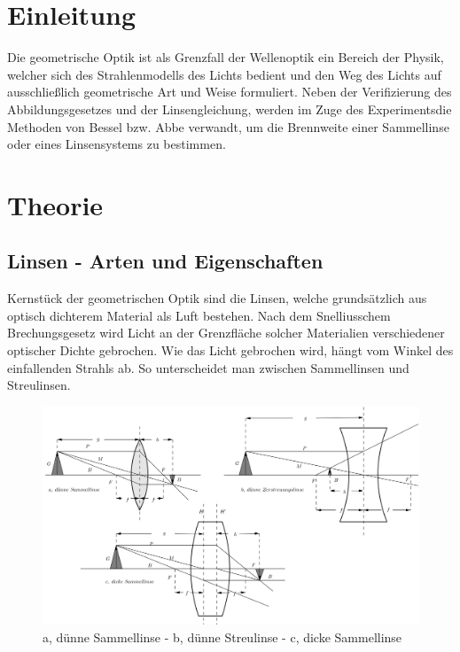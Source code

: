 
\section{Einleitung}
Die geometrische Optik ist als Grenzfall der Wellenoptik ein Bereich der Physik, welcher sich des Strahlenmodells des Lichts bedient und
den Weg des Lichts auf ausschließlich geometrische Art und Weise formuliert. Neben der Verifizierung des Abbildungsgesetzes und der 
Linsengleichung, werden im Zuge des Experimentsdie Methoden von Bessel bzw. Abbe verwandt, um die Brennweite einer Sammellinse oder 
eines Linsensystems zu bestimmen.

\section{Theorie}
\subsection{Linsen - Arten und Eigenschaften}
Kernstück der geometrischen Optik sind die Linsen, welche grundsätzlich aus optisch dichterem Material als Luft bestehen. Nach dem 
Snelliusschem Brechungsgesetz wird Licht an der Grenzfläche solcher Materialien verschiedener optischer Dichte gebrochen. Wie das Licht
gebrochen wird, hängt vom Winkel des einfallenden Strahls ab. So unterscheidet man zwischen Sammellinsen und Streulinsen. 

\begin{figure}[H]
 \includegraphics[width=\textwidth]{pics/408a.png}
 \centering
 \caption{a, dünne Sammellinse - b, dünne Streulinse - c, dicke Sammellinse}
 \label{linsen}
\end{figure}


